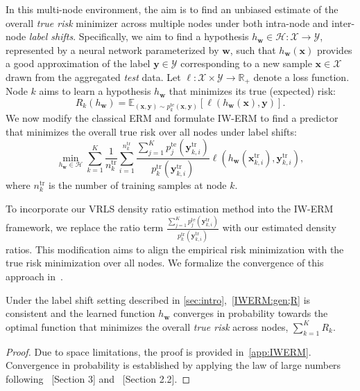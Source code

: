 In this multi-node environment, the aim is to find an unbiased estimate of the overall \emph{true risk} minimizer across multiple nodes under both intra-node and inter-node \emph{label shifts}. Specifically, we aim to find a hypothesis $h_{\boldsymbol{w}}\in\mathcal{H}: \mathcal{X} \rightarrow \mathcal{Y}$, represented by a neural network parameterized by ${\boldsymbol{w}}$,  such that $h_{\boldsymbol{w}}(\boldsymbol{x})$  provides a good approximation of the label $\boldsymbol{y} \in \mathcal{Y}$ corresponding to a new sample $\boldsymbol{x} \in \mathcal{X}$ drawn from the aggregated \emph{test} data.
Let $\ell:\mathcal{X} \times \mathcal{Y} \rightarrow \mathbb{R}_+$ denote a loss function. Node $k$ aims to learn a hypothesis $h_{\boldsymbol{w}}$ that minimizes its true (expected) risk:
\begin{equation}\tag{Local Risk}
    R_k(h_{\boldsymbol{w}}) = \mathbb{E}_{(\boldsymbol{x},\boldsymbol{y})\sim p_k^{\text{te}}(\boldsymbol{x},\boldsymbol{y})}[\ell(h_{\boldsymbol{w}}(\boldsymbol{x}),\boldsymbol{y})].
\end{equation}
We now modify the classical ERM and formulate IW-ERM to find a predictor that minimizes the overall true risk over all nodes under label shifts:
\begin{equation}\label{IWERM:gen;R}\tag{IW-ERM}
\min_{h_{\boldsymbol{w}} \in \mathcal{H}} \sum_{k=1}^K \frac{1}{n_k^{\text{tr}}}\sum_{i=1}^{n_k^{\text{tr}}} \frac{\sum_{j=1}^K p_j^{\text{te}}(\boldsymbol{y}_{k,i}^{\text{tr}})}{p_k^{\text{tr}}(\boldsymbol{y}_{k, i}^{\text{tr}})}\ell(h_{\boldsymbol{w}}(\boldsymbol{x}_{k,i}^{\text{tr}}),{\boldsymbol{y}}_{k,i}^{\text{tr}}),
\end{equation}
where $n_k^{\text{tr}}$ is the number of training samples at node $k$.

To incorporate our VRLS density ratio estimation method into the IW-ERM framework, we replace the ratio term $\frac{\sum_{j=1}^K p_j^{\text{te}}(\boldsymbol{y}_{k,i}^{\text{tr}})}{p_k^{\text{tr}}(\boldsymbol{y}_{k,i}^{\text{tr}})}$ with our estimated density ratios. 
This modification aims to align the empirical risk minimization with the true risk minimization over all nodes. We formalize the convergence of this approach in~.
\begin{proposition}\label{Prop:IW-ERM} 
Under the label shift setting described in \cref{sec:intro},~\eqref{IWERM:gen;R} is consistent and the learned function $h_{\boldsymbol{w}}$ converges in probability towards the optimal function that minimizes the overall \emph{true risk} across nodes, $\sum_{k=1}^K R_k$.
\end{proposition}
\begin{proof}
Due to space limitations, the proof is provided in~\cref{app:IWERM}. Convergence in probability is established by applying the law of large numbers following ~\citep{shimodaira2000improving}[Section 3] and ~\citep{sugiyama2007covariate}[Section 2.2].
\end{proof}
